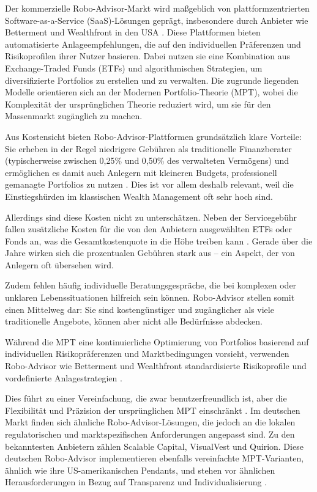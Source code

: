     Der kommerzielle Robo-Advisor-Markt wird maßgeblich von plattformzentrierten Software-as-a-Service (\acs{SaaS})-Lösungen geprägt, insbesondere durch Anbieter wie Betterment und Wealthfront in den USA \autocite{investopedia_wealthfront_betterment_2023}.
    Diese Plattformen bieten automatisierte Anlageempfehlungen, die auf den individuellen Präferenzen und Risikoprofilen ihrer Nutzer basieren.
    Dabei nutzen sie eine Kombination aus Exchange-Traded Funds (\acs{ETF}s) und algorithmischen Strategien, um diversifizierte Portfolios zu erstellen und zu verwalten.
    Die zugrunde liegenden Modelle orientieren sich an der Modernen Portfolio-Theorie (\acs{MPT}), wobei die Komplexität der ursprünglichen Theorie reduziert wird, um sie für den Massenmarkt zugänglich zu machen.

    Aus Kostensicht bieten Robo-Advisor-Plattformen grundsätzlich klare Vorteile: Sie erheben in der Regel niedrigere Gebühren als traditionelle Finanzberater (typischerweise zwischen 0,25\% und 0,50\% des verwalteten Vermögens) und ermöglichen es damit auch Anlegern mit kleineren Budgets, professionell gemanagte Portfolios zu nutzen \autocite{investopedia_wealthfront_betterment_2023}.
    Dies ist vor allem deshalb relevant, weil die Einstiegshürden im klassischen Wealth Management oft sehr hoch sind.

    Allerdings sind diese Kosten nicht zu unterschätzen.
    Neben der Servicegebühr fallen zusätzliche Kosten für die von den Anbietern ausgewählten \acs{ETF}s oder Fonds an, was die Gesamtkostenquote in die Höhe treiben kann \autocite{investopedia_wealthfront_betterment_2023}.
    Gerade über die Jahre wirken sich die prozentualen Gebühren stark aus – ein Aspekt, der von Anlegern oft übersehen wird.

    Zudem fehlen häufig individuelle Beratungsgespräche, die bei komplexen oder unklaren Lebenssituationen hilfreich sein können.
    Robo-Advisor stellen somit einen Mittelweg dar: Sie sind kostengünstiger und zugänglicher als viele traditionelle Angebote, können aber nicht alle Bedürfnisse abdecken.

    Während die \acs{MPT} eine kontinuierliche Optimierung von Portfolios basierend auf individuellen Risikopräferenzen und Marktbedingungen vorsieht, verwenden Robo-Advisor wie Betterment und Wealthfront standardisierte Risikoprofile und vordefinierte Anlagestrategien \autocite{investopedia_wealthfront_betterment_2023}.

    Dies führt zu einer Vereinfachung, die zwar benutzerfreundlich ist, aber die Flexibilität und Präzision der ursprünglichen \acs{MPT} einschränkt \autocite[S. 30]{hecker2017}.
    Im deutschen Markt finden sich ähnliche Robo-Advisor-Lösungen, die jedoch an die lokalen regulatorischen und marktspezifischen Anforderungen angepasst sind.
    Zu den bekanntesten Anbietern zählen Scalable Capital, VisualVest und Quirion.
    Diese deutschen Robo-Advisor implementieren ebenfalls vereinfachte \acs{MPT}-Varianten, ähnlich wie ihre US-amerikanischen Pendants, und stehen vor ähnlichen Herausforderungen in Bezug auf Transparenz und Individualisierung \autocite[S. 31]{hecker2017}.

